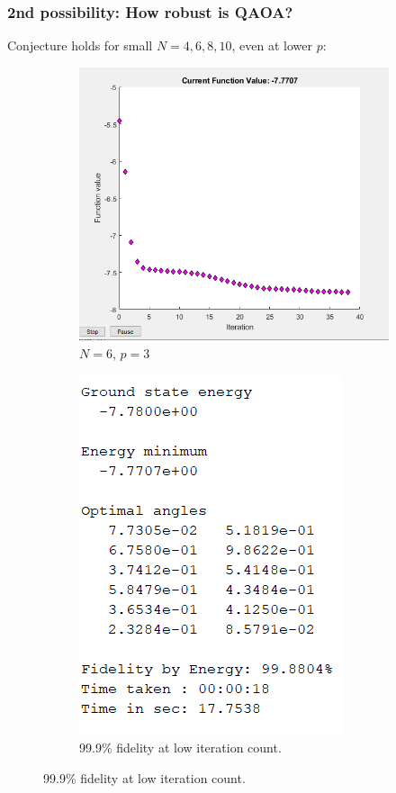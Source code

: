 \documentclass{beamer}
\theoremstyle{definition}
\begin{document}


\begin{frame}
\frametitle{2nd possibility: How robust is QAOA?}



Conjecture holds for small $N = 4, 6, 8, 10$, even at lower $p$:



\begin{figure}[!htb]
	\centering
	\begin{subfigure}{0.5 \textwidth}
		\centering
		\includegraphics[scale=0.35]{N_6_p_3.PNG}
		\caption{$N=6$, $p=3$}
	\end{subfigure}%
	\begin{subfigure}{0.5 \textwidth}
		\centering
		\includegraphics[scale=0.46]{N_6_p_3_out}
		\caption{99.9\% fidelity at low iteration count.}
	\end{subfigure}
\end{figure}

\end{frame}
\end{document}
